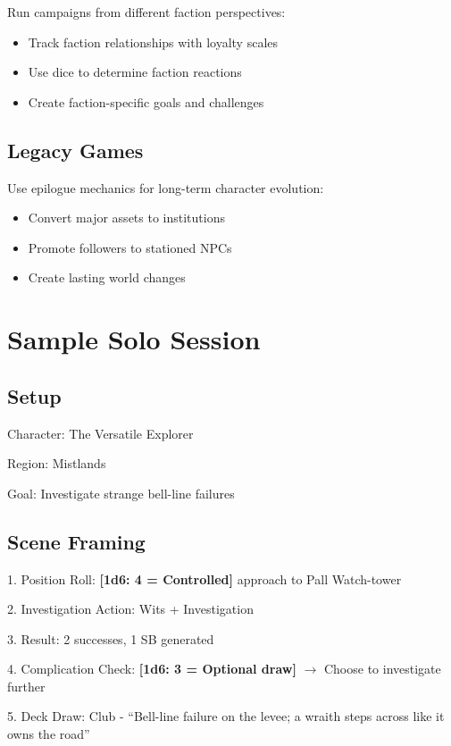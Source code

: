 \documentclass[11pt]{article}
\newcommand{\dice}[1]{\textbf{[1d6: #1]}}
\begin{document}
Run campaigns from different faction perspectives:
\begin{itemize}
    \item Track faction relationships with loyalty scales
    \item Use dice to determine faction reactions
    \item Create faction-specific goals and challenges
\end{itemize}

\subsection{Legacy Games}

Use epilogue mechanics for long-term character evolution:
\begin{itemize}
    \item Convert major assets to institutions
    \item Promote followers to stationed NPCs
    \item Create lasting world changes
\end{itemize}

\section{Sample Solo Session}

\subsection{Setup}

Character: The Versatile Explorer

Region: Mistlands

Goal: Investigate strange bell-line failures

\subsection{Scene Framing}

1. Position Roll: \dice{4 = Controlled} approach to Pall Watch-tower

2. Investigation Action: Wits + Investigation

3. Result: 2 successes, 1 SB generated

4. Complication Check: \dice{3 = Optional draw} $\rightarrow$ Choose to investigate further

5. Deck Draw: Club - ``Bell-line failure on the levee; a wraith steps across like it owns the road''
\end{document}
